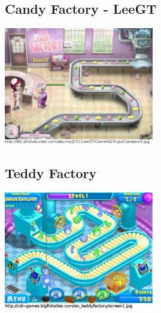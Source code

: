 \documentclass[a4paper]{scrartcl}
\begin{document}
    \begin{multicols}{2}
        \subsection{Candy Factory - LeeGT}
            \includegraphics[width=0.49\textwidth]{similar_games/CandyFactoryLeeGT}

        \subsection{Teddy Factory}
            \includegraphics[width=0.49\textwidth]{similar_games/TeddyFactory}
    \end{multicols}
\end{document}
